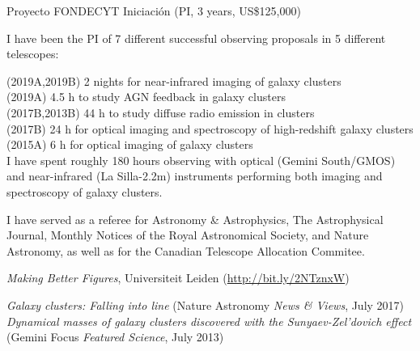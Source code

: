 \documentclass[11pt]{article}
\begin{document}
\hline

\pagebreak


\noindent
{} Proyecto FONDECYT Iniciaci\'on (PI, 3 years, US\$125,000)



\noindent
I have been the PI of 7 different successful observing proposals in 5 different telescopes:

\noindent
{} (2019A,2019B) 2 nights for near-infrared imaging of galaxy clusters\\
 (2019A) 4.5 h to study AGN feedback in galaxy clusters\\
 (2017B,2013B) 44 h to study diffuse radio emission in clusters\\
 (2017B) 24 h for optical imaging and spectroscopy of high-redshift galaxy clusters\\
 (2015A) 6 h for optical imaging of galaxy clusters\\


{I have spent roughly 180 hours observing with 
optical (Gemini South/GMOS) and near-infrared (La Silla-2.2m) instruments performing both 
imaging and spectroscopy of galaxy clusters.}


%


\noindent
I have served as a referee for Astronomy \& Astrophysics, The Astrophysical Journal, Monthly Notices of the Royal Astronomical Society, and Nature Astronomy,
as well as for the Canadian Telescope Allocation Commitee.


\noindent
{} \emph{Making Better Figures}, Universiteit Leiden (\url{http://bit.ly/2NTznxW})


\noindent
\emph{Galaxy clusters: Falling into line} (Nature Astronomy \emph{News \& Views}, July 2017)\\
\emph{Dynamical masses of galaxy clusters discovered with the Sunyaev-Zel'dovich effect} (Gemini Focus \emph{Featured Science}, July 2013)
\end{document}
